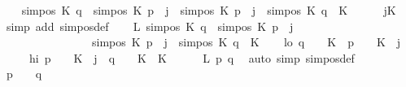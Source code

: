 \begin{isabellebody}
\ \ \isamarkupfalse%
\ {\isachardoublequoteopen}sim{\isacharunderscore}{\kern0pt}pos\ K\ q\ {\isasymle}\ sim{\isacharunderscore}{\kern0pt}pos\ K\ p\ {\isacharplus}{\kern0pt}\ j\ {\isasymand}\ sim{\isacharunderscore}{\kern0pt}pos\ K\ p\ {\isacharplus}{\kern0pt}\ j\ {\isacharless}{\kern0pt}\ sim{\isacharunderscore}{\kern0pt}pos\ K\ q\ {\isacharplus}{\kern0pt}\ K{\isachardoublequoteclose}\isanewline
\ \ \ \ \isamarkupfalse%
\ jK\ \isamarkupfalse%
\ {\isacharparenleft}{\kern0pt}simp\ add{\isacharcolon}{\kern0pt}\ sim{\isacharunderscore}{\kern0pt}pos{\isacharunderscore}{\kern0pt}def{\isacharparenright}{\kern0pt}\isanewline
{}\isamarkupfalse%
\isanewline
\ \ \isamarkupfalse%
\ L{\isacharcolon}{\kern0pt}\ {\isachardoublequoteopen}sim{\isacharunderscore}{\kern0pt}pos\ K\ q\ {\isasymle}\ sim{\isacharunderscore}{\kern0pt}pos\ K\ p\ {\isacharplus}{\kern0pt}\ j\isanewline
\ \ \ \ \ \ \ \ \ \ \ \ \ \ \ {\isasymand}\ sim{\isacharunderscore}{\kern0pt}pos\ K\ p\ {\isacharplus}{\kern0pt}\ j\ {\isacharless}{\kern0pt}\ sim{\isacharunderscore}{\kern0pt}pos\ K\ q\ {\isacharplus}{\kern0pt}\ K{\isachardoublequoteclose}\isanewline
\ \ \isamarkupfalse%
\ lo{\isacharcolon}{\kern0pt}\ {\isachardoublequoteopen}{\isacharparenleft}{\kern0pt}q\ {\isacharminus}{\kern0pt}\ {}{\isacharparenright}{\kern0pt}\ {\isacharasterisk}{\kern0pt}\ K\ {\isasymle}\ {\isacharparenleft}{\kern0pt}p\ {\isacharminus}{\kern0pt}\ {}{\isacharparenright}{\kern0pt}\ {\isacharasterisk}{\kern0pt}\ K\ {\isacharplus}{\kern0pt}\ j{\isachardoublequoteclose}\isanewline
\ \ \ \ \ hi{\isacharcolon}{\kern0pt}\ {\isachardoublequoteopen}{\isacharparenleft}{\kern0pt}p\ {\isacharminus}{\kern0pt}\ {}{\isacharparenright}{\kern0pt}\ {\isacharasterisk}{\kern0pt}\ K\ {\isacharplus}{\kern0pt}\ j\ {\isacharless}{\kern0pt}\ {\isacharparenleft}{\kern0pt}q\ {\isacharminus}{\kern0pt}\ {}{\isacharparenright}{\kern0pt}\ {\isacharasterisk}{\kern0pt}\ K\ {\isacharplus}{\kern0pt}\ K{\isachardoublequoteclose}\isanewline
\ \ \ \ \isamarkupfalse%
\ L\ p{}\ q{}\ \isamarkupfalse%
\ {\isacharparenleft}{\kern0pt}auto\ simp{\isacharcolon}{\kern0pt}\ sim{\isacharunderscore}{\kern0pt}pos{\isacharunderscore}{\kern0pt}def{\isacharparenright}{\kern0pt}\isanewline
\ \ \isamarkupfalse%
\ {\isachardoublequoteopen}p\ {\isacharminus}{\kern0pt}\ {}\ {\isacharequal}{\kern0pt}\ q\ {\isacharminus}{\kern0pt}\ {}{\isachardoublequoteclose}\isanewline

\end{isabellebody}
